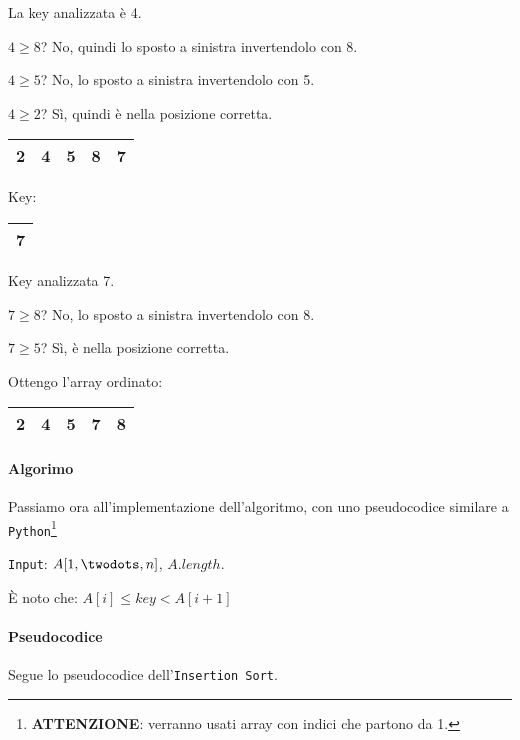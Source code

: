 \noindent La key analizzata è 4.\par
$4 \geq 8$? No, quindi lo sposto a sinistra invertendolo con 8.\par 
$4 \geq 5$? No, lo sposto a sinistra invertendolo con 5.\par
$4 \geq 2$? Sì, quindi è nella posizione corretta.

\begin{center}
	\begin{tabular}{|l|l|l|l|l|}
		\hline
		2 & 4 & 5 & 8 & 7 \\
		\hline
	\end{tabular}
	\hspace{1cm} Key: 
	\begin{tabular}{|l|}
		\hline
		7 \\
		\hline
	\end{tabular}
\end{center}

\noindent Key analizzata 7. \par
$7 \geq 8$? No, lo sposto a sinistra invertendolo con 8.\par
$7 \geq 5$? Sì, è nella posizione corretta.\par

\smallskip
\noindent Ottengo l'array ordinato:

\begin{center}
	\begin{tabular}{|l|l|l|l|l|}
		\hline
		2 & 4 & 5 & 7 & 8 \\
		\hline
	\end{tabular}
\end{center}

\newpage

\paragraph{Algorimo} Passiamo ora all'implementazione dell'algoritmo, con uno pseudocodice similare a \texttt{Python}\footnote{\textbf{ATTENZIONE}: verranno usati array con indici
che partono da 1.}\par

\bigskip

\texttt{Input}: $A[1, \twodots ,n]$, $A.length$.

\begin{center}
	È noto che: 
	$A[i] \leq key < A[i+1]$
\end{center}

\paragraph{Pseudocodice} Segue lo pseudocodice dell'\texttt{Insertion Sort}.

